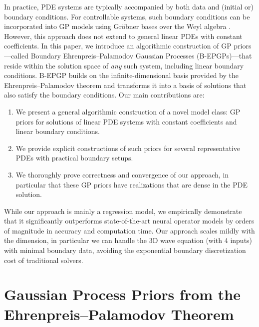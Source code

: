 \documentclass{article} %
\theoremstyle{plain}
\theoremstyle{definition}
\theoremstyle{remark}
\begin{document}
In practice, PDE systems are typically accompanied by both data and (initial or) boundary conditions. For controllable systems, such boundary conditions can be incorporated into GP models using Gröbner bases over the Weyl algebra \citep{LH_AlgorithmicLinearlyConstrainedGaussianProcessesBoundaryConditions}. However, this approach does not extend to general linear PDEs with constant coefficients. In this paper, we introduce an algorithmic construction of GP priors—called Boundary Ehrenpreis--Palamodov Gaussian Processes (B-EPGPs)—that reside within the solution space of \emph{any} such system, including linear boundary conditions. B-EPGP builds on the infinite-dimensional basis provided by the Ehrenpreis--Palamodov theorem and transforms it into a basis of solutions that also satisfy the boundary conditions.
Our main contributions are:
\begin{enumerate}
    \item We present a general algorithmic construction of a novel model class: GP priors for solutions of linear PDE systems with constant coefficients and linear boundary conditions.
    \item We provide explicit constructions of such priors for several representative PDEs with practical boundary setups.
    \item We thoroughly prove correctness and convergence of our approach, in particular that these GP priors have realizations that are dense in the PDE solution.
\end{enumerate}

While our approach is mainly a regression model, we empirically demonstrate that it significantly outperforms state-of-the-art neural operator models by orders of magnitude in accuracy and computation time.
Our approach scales mildly with the dimension, in particular we can handle the 3D wave equation (with 4 inputs) with minimal boundary data, avoiding the exponential boundary discretization cost of traditional solvers.


\section{Gaussian Process Priors from the Ehrenpreis--Palamodov Theorem}

\end{document}
